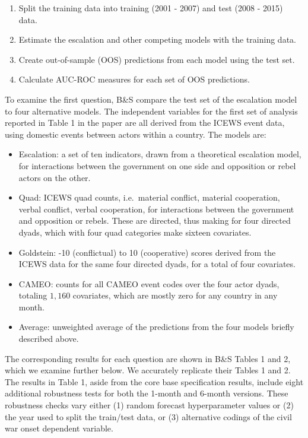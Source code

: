 \documentclass[
]{article}
\providecommand{\tightlist}{%
  \setlength{\itemsep}{0pt}\setlength{\parskip}{0pt}}
\begin{document}
\begin{enumerate}
\def\labelenumi{\arabic{enumi}.}
\tightlist
\item
  Split the training data into training (2001 - 2007) and test (2008 - 2015) data.
\item
  Estimate the escalation and other competing models with the training data.
\item
  Create out-of-sample (OOS) predictions from each model using the test set.
\item
  Calculate AUC-ROC measures for each set of OOS predictions.
\end{enumerate}

To examine the first question, B\&S compare the test set of the escalation model to four alternative models. The independent variables for the first set of analysis reported in Table 1 in the paper are all derived from the ICEWS event data, using domestic events between actors within a country. The models are:

\begin{itemize}
\tightlist
\item
  Escalation: a set of ten indicators, drawn from a theoretical escalation model, for interactions between the government on one side and opposition or rebel actors on the other.
\item
  Quad: ICEWS quad counts, i.e.~material conflict, material cooperation, verbal conflict, verbal cooperation, for interactions between the government and opposition or rebels. These are directed, thus making for four directed dyads, which with four quad categories make sixteen covariates.
\item
  Goldstein: -10 (conflictual) to 10 (cooperative) scores derived from the ICEWS data for the same four directed dyads, for a total of four covariates.
\item
  CAMEO: counts for all CAMEO event codes over the four actor dyads, totaling \(1,160\) covariates, which are mostly zero for any country in any month.
\item
  Average: unweighted average of the predictions from the four models briefly described above.
\end{itemize}

The corresponding results for each question are shown in B\&S Tables 1 and 2, which we examine further below. We accurately replicate their Tables 1 and 2. The results in Table 1, aside from the core base specification results, include eight additional robustness tests for both the 1-month and 6-month versions. These robustness checks vary either (1) random forecast hyperparameter values or (2) the year used to split the train/test data, or (3) alternative codings of the civil war onset dependent variable.
\end{document}

